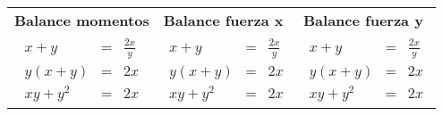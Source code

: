 \documentclass[11pt,letterpaper]{article}
\begin{document}
\begin{table}[!hbt]
    \centering
    \begin{tabularx}{\columnwidth}{*{3}{W}}
    \textbf{Balance momentos}&\textbf{Balance fuerza x}&\textbf{Balance fuerza y}\\
     \begin{eqnarray}\label{eqn:Reaction_A}
           \nonumber x+y & = & \frac{2x}{y} \\ 
           y(x+y) & =  & 2x \\ \nonumber
           xy+y^2 & = & 2x 
      \end{eqnarray} &  \begin{eqnarray}\label{eqn:Reaction_B}
           x+y & = & \frac{2x}{y} \\
           y(x+y) & =  & 2x \\ 
           xy+y^2 & = & 2x 
      \end{eqnarray} & \begin{eqnarray}\label{eqn:Reaction_C}
           x+y & = & \frac{2x}{y} \\ 
           y(x+y) & =  & 2x \\ 
           xy+y^2 & = & 2x 
      \end{eqnarray}\\
    \end{tabularx}
    \label{tab:my_label}
\end{table}
\end{document}
